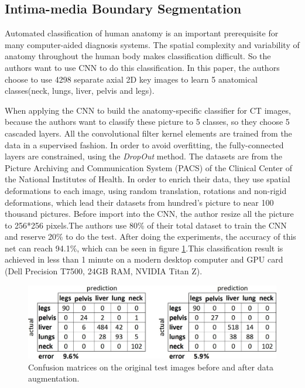 \documentclass[10pt,twocolumn,letterpaper]{article}
\begin{document}
\subsection{Intima-media Boundary Segmentation}

Automated classification of human anatomy is an important prerequisite for many computer-aided diagnosis systems. The spatial complexity and variability of anatomy throughout the human body makes classification difficult. So the authors want to use CNN to do this classification. In this paper, the authors choose to use 4298 separate axial 2D key images to learn 5 anatomical classes(neck, lungs, liver, pelvis and legs)\cite{roth2015anatomy}.

When applying the CNN to build the anatomy-specific classifier for CT images, because the authors want to classify these picture to 5 classes, so they choose 5 cascaded layers. All the convolutional filter kernel elements are trained from the data in a supervised fashion. In order to avoid overfitting, the fully-connected layers are constrained, using the \textit{DropOut} method. The datasets are from the Picture Archiving and Communication System (PACS) of the Clinical Center of the National Institutes of Health. In order to enrich their data, they use spatial deformations to each image, using random translation, rotations and non-rigid deformations, which lead their datasets from hundred's picture to near 100 thousand pictures. Before import into the CNN, the author resize all the picture to 256*256 pixels.The authors use 80\% of their total dataset to train the CNN and reserve 20\% to do the test. After doing the experiments, the accuracy of this net can reach 94.1\%, which can be seen in figure \ref{fig:lmnong}.This classification
result is achieved in less than 1 minute on a modern desktop computer and GPU card (Dell Precision T7500,
24GB RAM, NVIDIA Titan Z).

\begin{figure}[t]
	\begin{center}
		\includegraphics[width=0.8\linewidth]{Pic/1.jpg}
	\end{center}
	\caption{Confusion matrices on the original test images before and after data augmentation.} \label{fig:lmnong}

\end{figure}
\end{document}

